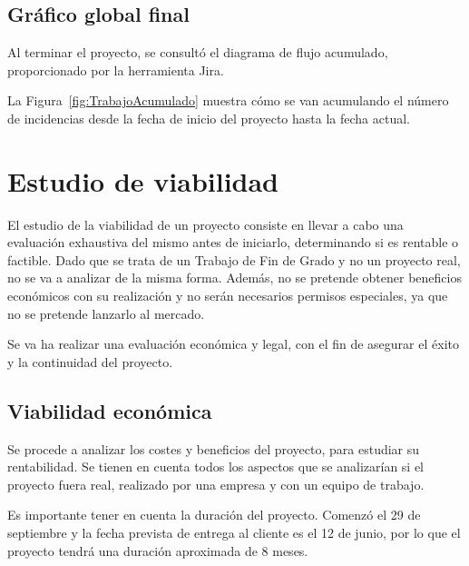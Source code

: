 \subsection{Gráfico global final}
Al terminar el proyecto, se consultó el diagrama de flujo acumulado, proporcionado por la herramienta Jira. 

La Figura~\ref{fig:TrabajoAcumulado} muestra cómo se van acumulando el número de incidencias desde la fecha de inicio del proyecto hasta la fecha actual.




\section{Estudio de viabilidad}
El estudio de la viabilidad de un proyecto consiste en llevar a cabo una evaluación exhaustiva del mismo antes de iniciarlo, determinando si es rentable o factible. Dado que se trata de un Trabajo de Fin de Grado y no un proyecto real, no se va a analizar de la misma forma. Además, no se pretende obtener beneficios económicos con su realización y no serán necesarios permisos especiales, ya que no se pretende lanzarlo al mercado.

Se va ha realizar una evaluación económica y legal, con el fin de asegurar el éxito y la continuidad del proyecto.



\subsection{Viabilidad económica}
Se procede a analizar los costes y beneficios del proyecto, para estudiar su rentabilidad. Se tienen en cuenta todos los aspectos que se analizarían si el proyecto fuera real, realizado por una empresa y con un equipo de trabajo.

Es importante tener en cuenta la duración del proyecto. Comenzó el 29 de septiembre y la fecha prevista de entrega al cliente es el 12 de junio, por lo que el proyecto tendrá una duración aproximada de 8 meses.


